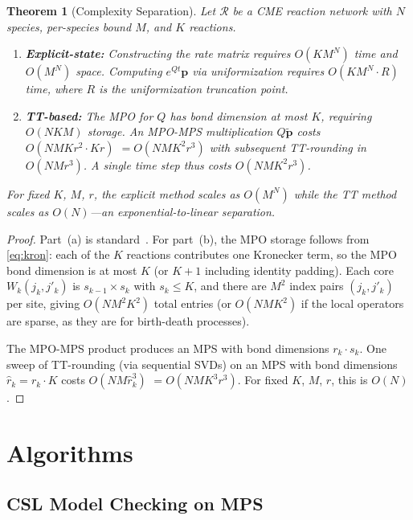 \documentclass[11pt]{article}
\newtheorem{theorem}{Theorem}
\newcommand{\calR}{\mathcal{R}}
\begin{document}
\begin{theorem}[Complexity Separation]\label{thm:complexity}
Let $\calR$ be a CME reaction network with $N$ species,
per-species bound $M$, and $K$ reactions.
\begin{enumerate}[label=(\alph*)]
\item \textbf{Explicit-state:}
  Constructing the rate matrix requires $O(KM^N)$ time and $O(M^N)$
  space.
  Computing $e^{Qt}\mathbf{p}$ via uniformization requires
  $O(KM^N \cdot R)$ time, where $R$ is the uniformization truncation
  point.
\item \textbf{TT-based:}
  The MPO for $Q$ has bond dimension at most $K$, requiring
  $O(NKM)$ storage.
  An MPO-MPS multiplication $Q\tilde{\mathbf{p}}$ costs
  $O(NMK r^2 \cdot Kr)$ $= O(NMK^2 r^3)$ with subsequent
  TT-rounding in $O(NM r^3)$.
  A single time step thus costs $O(NMK^2 r^3)$.
\end{enumerate}
For fixed $K$, $M$, $r$, the explicit method scales as $O(M^N)$
while the TT method scales as $O(N)$---an exponential-to-linear
separation.
\end{theorem}

\begin{proof}
Part~(a) is standard~\cite{kwiatkowska2011}.
For part~(b), the MPO storage follows from \eqref{eq:kron}:
each of the $K$ reactions contributes one Kronecker term, so the
MPO bond dimension is at most $K$ (or $K+1$ including identity padding).
Each core $W_k(j_k, j'_k)$ is $s_{k-1}\times s_k$ with
$s_k \leq K$, and there are $M^2$ index pairs $(j_k, j'_k)$ per
site, giving $O(NM^2 K^2)$ total entries (or $O(NMK^2)$ if the
local operators are sparse, as they are for birth-death processes).

The MPO-MPS product produces an MPS with bond dimensions
$r_k \cdot s_k$.
One sweep of TT-rounding (via sequential SVDs) on an MPS with
bond dimensions $\hat{r}_k = r_k \cdot K$ costs
$O(NM \hat{r}_k^3)$ $= O(NMK^3 r^3)$.
For fixed $K$, $M$, $r$, this is $O(N)$.
\end{proof}

\section{Algorithms}\label{sec:algorithms}

\subsection{CSL Model Checking on MPS}\label{sec:algorithms:csl}
\end{document}
